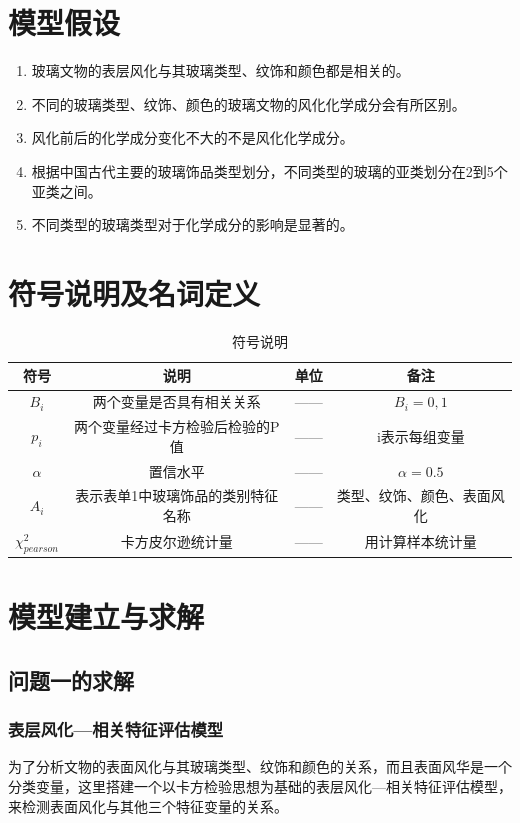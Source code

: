 \documentclass[withoutpreface,bwprint]{cumcmthesis}%
\begin{document}
	\section{模型假设}
	\begin{enumerate}
	\item 玻璃文物的表层风化与其玻璃类型、纹饰和颜色都是相关的。
	\item 不同的玻璃类型、纹饰、颜色的玻璃文物的风化化学成分会有所区别。
	\item 风化前后的化学成分变化不大的不是风化化学成分。
	\item 根据中国古代主要的玻璃饰品类型划分，不同类型的玻璃的亚类划分在2到5个亚类之间。
	\item 不同类型的玻璃类型对于化学成分的影响是显著的。
	\end{enumerate}


	\section{符号说明及名词定义}

	\begin{table}[!htb]
	\centering
	\caption{符号说明}
	\begin{tabular}{cccc}
		\toprule[1.5pt]
		符号 & 说明 & 单位 & 备注\\
		\midrule[1pt]
		$B_{i}$ & 两个变量是否具有相关关系 & —— & $B_{i} = 0,1$\\
		$p_{i}$ & 两个变量经过卡方检验后检验的P值 & —— & i表示每组变量\\
		$\alpha$ & 置信水平 & —— & $\alpha = 0.5$\\
		$A_{i}$ & 表示表单1中玻璃饰品的类别特征名称 & —— & 类型、纹饰、颜色、表面风化\\
		$\chi^{2}_{pearson}$&卡方皮尔逊统计量&——&用计算样本统计量\\
	\bottomrule[1.5pt]
	\end{tabular}
	\end{table}

	\section{模型建立与求解}
	\subsection{问题一的求解}
	
	\subsubsection{表层风化—相关特征评估模型}
	为了分析文物的表面风化与其玻璃类型、纹饰和颜色的关系，而且表面风华是一个分类变量，这里搭建一个以卡方检验思想为基础的表层风化—相关特征评估模型，来检测表面风化与其他三个特征变量的关系。
	
\end{document}

